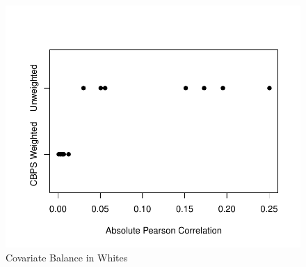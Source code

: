 \documentclass[]{AEA}
\begin{document}
\begin{figure} \label{balPlotWhite}
\caption{Covariate Balance in Whites}


\begin{center}\includegraphics{Final-Draft_files/figure-latex/unnamed-chunk-13-1} \end{center}



\FloatBarrier

\end{figure}
\end{document}
